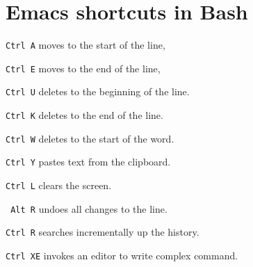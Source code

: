 \section{Emacs shortcuts in Bash}
\begin{enumx}
\item \texttt{Ctrl A} moves to the start of the line,
\item \texttt{Ctrl E} moves to the end of the line,
\item \texttt{Ctrl U} deletes to the beginning of the line.
\item \texttt{Ctrl K} deletes to the end of the line.
\item \texttt{Ctrl W} deletes to the start of the word.
\item \texttt{Ctrl Y} pastes text from the clipboard.
\item \texttt{Ctrl L} clears the screen.
\item \texttt{ Alt R} undoes all changes to the line.
\item \texttt{Ctrl R} searches incrementally up the history.
\item \texttt{Ctrl XE} invokes an editor to write complex command.
\end{enumx}
